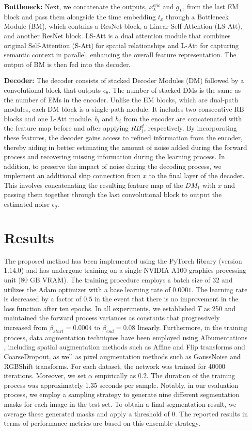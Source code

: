 \documentclass[runningheads]{llncs}
\begin{document}
\noindent\textbf{Bottleneck:} Next, we concatenate the outputs, $x_L^{enc}$ and $g_L$, from the last EM block and pass them alongside the time embedding $t_x$ through a Bottleneck Module (BM), which contains a ResNet block, a Linear Self-Attention (LS-Att), and another ResNet block. LS-Att is a dual attention module that combines original Self-Attention (S-Att) for spatial relationships and L-Att for capturing semantic context in parallel, enhancing the overall feature representation. The output of BM is then fed into the decoder.

\noindent\textbf{Decoder:} The decoder consists of stacked Decoder Modules (DM) followed by a convolutional block that outputs $\epsilon_\theta$. The number of stacked DMs is the same as the number of EMs in the encoder. Unlike the EM blocks, which are dual-path modules, each DM block is a single-path module. It includes two consecutive RB blocks and one L-Att module. $b_{i}$ and $h_{i}$ from the encoder are concatenated with the feature map before and after applying $RB_1^d$, respectively. By incorporating these features, the decoder gains access to refined information from the encoder, thereby aiding in better estimating the amount of noise added during the forward process and recovering missing information during the learning process. In addition, to preserve the impact of noise during the decoding process, we implement an additional skip connection from $x$ to the final layer of the decoder. This involves concatenating the resulting feature map of the $DM_1$ with $x$ and passing them together through the last convolutional block to output the estimated noise $\epsilon_\theta$.


\section{Results}
The proposed method has been implemented using the PyTorch library (version 1.14.0) and has undergone training on a single NVIDIA A100 graphics processing unit (80 GB VRAM). The training procedure employs a batch size of $32$ and utilizes the Adam optimizer with a base learning rate of $0.0001$. The learning rate is decreased by a factor of $0.5$ in the event that there is no improvement in the loss function after ten epochs. In all experiments, we established $T$ as 250 and maintained the forward process variances as constants that progressively increased from $\beta_{start}=0.0004$ to $\beta_{end}=0.08$ linearly. Furthermore, in the training process, data augmentation techniques have been employed using Albumentations \cite{info11020125}, including spatial augmentation methods such as Affine and Flip transforms and CoarseDropout, as well as pixel augmentation methods such as GaussNoise and RGBShift transforms. For each dataset, the network was trained for 40000 iterations. Moreover, we set $\alpha$ empirically as 0.2. The duration of the training process was approximately 1.35 seconds per sample. Notably, in our evaluation process, we employ a sampling strategy to generate nine different segmentation masks for each image in the test set. To obtain a final segmentation result, we average these generated masks and apply a threshold of 0. The reported results in terms of performance metrics are based on this ensemble strategy.
\end{document}
